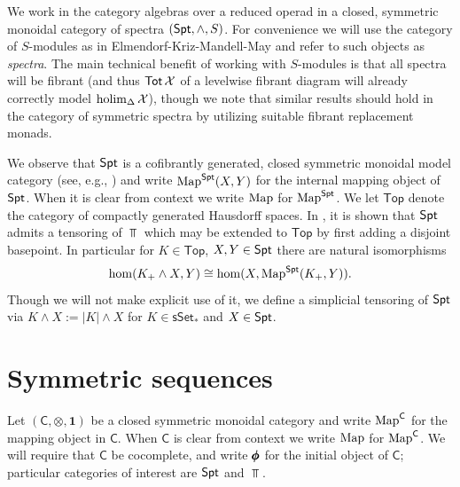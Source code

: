 
We work in the category algebras over a reduced operad in a closed, symmetric monoidal category of spectra $(\mathsf{Spt}, \wedge, S)$. For convenience we will use the category of $S$-modules as in Elmendorf-Kriz-Mandell-May \cite{EKMM} and refer to such objects as \textit{spectra}. The main technical benefit of working with $S$-modules is that all spectra will be fibrant (and thus $\operatorname{\mathsf{Tot}} \mathcal{X}$ of a levelwise fibrant diagram will already correctly model $\operatorname{holim}_{\Delta} \mathcal{X}$), though we note that similar results should hold in the category of symmetric spectra by utilizing suitable fibrant replacement monads. 

We observe that $\mathsf{Spt}$ is a cofibrantly generated, closed symmetric monoidal model category (see, e.g.,  \cite[Definition 1.12]{AC-1}) and write $\operatorname{Map}^{\mathsf{Spt}}(X,Y)$ for the internal mapping object of $\mathsf{Spt}$. When it is clear from context we write $\operatorname{Map}$ for $\operatorname{Map}^{\mathsf{Spt}}$. We let $\mathsf{Top}$ denote the category of compactly generated Hausdorff spaces. In \cite{EKMM}, it is shown that $\mathsf{Spt}$ admits a tensoring of $\Top$ which may be extended to $\mathsf{Top}$ by first adding a disjoint basepoint. In particular for $K\in \mathsf{Top}$, $X,Y\in \mathsf{Spt}$ there are natural isomorphisms \[\hom(K_+ \wedge X, Y)\cong \hom(X, \operatorname{Map}^{\mathsf{Spt}} (K_+, Y)).\]  Though we will not make explicit use of it, we define a simplicial tensoring of $\mathsf{Spt}$ via $K\wedge X:=|K|\wedge X$ for $K\in \mathsf{sSet}_*$ and $X\in \mathsf{Spt}$. %



\section{Symmetric sequences}
\label{sec:comp-prod-rmks} Let $(\mathsf{C}, \otimes, \mathbf{1})$ be a closed symmetric monoidal category and write $\operatorname{Map}^{\mathsf{C}}$ for the mapping object in $\mathsf{C}$. When $\mathsf{C}$ is clear from context we write $\operatorname{Map}$ for $\operatorname{Map}^{\mathsf{C}}$. We will require that $\mathsf{C}$ be cocomplete, and write $\pmb{\phi}$ for the initial object of $\mathsf{C}$; particular categories of interest are $\mathsf{Spt}$ and $\Top$.

